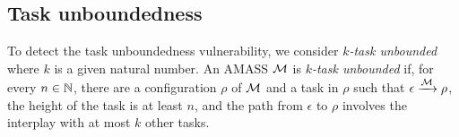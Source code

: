 %
%


\subsection{Task unboundedness} \label{sec:task-unbound}

To detect the task unboundedness vulnerability, %
we consider %
\emph{$k$-task unbounded} where $k$ is a given natural number.
%
An AMASS ${\mathcal{M} }$ is \emph{$k$-task unbounded} if, for every $n \in {\mathbb{N} }$, there are a configuration $\rho$ of ${\mathcal{M} }$ and a task in $\rho$ such that $\epsilon \xrightarrow{{\mathcal{M} }} \rho$, the height of the task is at least $n$, and the path from $\epsilon$ to $\rho$ %
%
involves the interplay with at most $k$ other tasks.  

%


